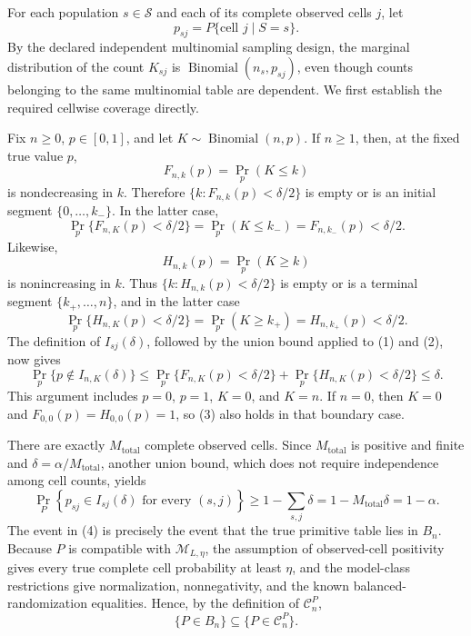 For each population \(s\in\mathcal S\) and each of its complete observed cells \(j\), let
\[
p_{sj}=P\{\text{cell }j\mid S=s\}.
\]
By the declared independent multinomial sampling design, the marginal distribution of the count \(K_{sj}\) is \(\operatorname{Binomial}(n_s,p_{sj})\), even though counts belonging to the same multinomial table are dependent.  We first establish the required cellwise coverage directly.

Fix \(n\geq 0\), \(p\in[0,1]\), and let \(K\sim\operatorname{Binomial}(n,p)\).  If \(n\geq 1\), then, at the fixed true value \(p\),
\[
F_{n,k}(p)=\Pr_p(K\leq k)
\]
is nondecreasing in \(k\).  Therefore \(\{k:F_{n,k}(p)<\delta/2\}\) is empty or is an initial segment \(\{0,\ldots,k_-\}\).  In the latter case,
\[
\Pr_p\{F_{n,K}(p)<\delta/2\}
=\Pr_p(K\leq k_-)
=F_{n,k_-}(p)
<\delta/2.
\tag{1}
\]
Likewise,
\[
H_{n,k}(p)=\Pr_p(K\geq k)
\]
is nonincreasing in \(k\).  Thus \(\{k:H_{n,k}(p)<\delta/2\}\) is empty or is a terminal segment \(\{k_+,\ldots,n\}\), and in the latter case
\[
\Pr_p\{H_{n,K}(p)<\delta/2\}
=\Pr_p(K\geq k_+)
=H_{n,k_+}(p)
<\delta/2.
\tag{2}
\]
The definition of \(I_{sj}(\delta)\), followed by the union bound applied to (1) and (2), now gives
\[
\Pr_p\{p\notin I_{n,K}(\delta)\}
\leq
\Pr_p\{F_{n,K}(p)<\delta/2\}
+\Pr_p\{H_{n,K}(p)<\delta/2\}
\leq\delta.
\tag{3}
\]
This argument includes \(p=0\), \(p=1\), \(K=0\), and \(K=n\).  If \(n=0\), then \(K=0\) and \(F_{0,0}(p)=H_{0,0}(p)=1\), so (3) also holds in that boundary case.

There are exactly \(M_{\mathrm{total}}\) complete observed cells.  Since \(M_{\mathrm{total}}\) is positive and finite and \(\delta=\alpha/M_{\mathrm{total}}\), another union bound, which does not require independence among cell counts, yields
\[
\Pr_P\left\{p_{sj}\in I_{sj}(\delta)
\text{ for every }(s,j)\right\}
\geq 1-\sum_{s,j}\delta
=1-M_{\mathrm{total}}\delta
=1-\alpha.
\tag{4}
\]
The event in (4) is precisely the event that the true primitive table lies in \(B_n\).  Because \(P\) is compatible with \(\mathcal M_{L,\eta}\), the assumption of observed-cell positivity gives every true complete cell probability at least \(\eta\), and the model-class restrictions give normalization, nonnegativity, and the known balanced-randomization equalities.  Hence, by the definition of \(\mathcal C_n^P\),
\[
\{P\in B_n\}\subseteq\{P\in\mathcal C_n^P\}.
\tag{5}
\]

